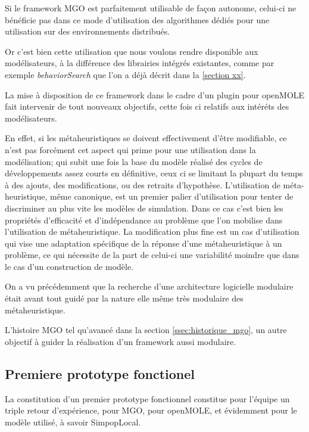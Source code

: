 Si le framework MGO est parfaitement utilisable de façon autonome, celui-ci ne bénéficie pas dans ce mode d'utilisation des algorithmes dédiés pour une utilisation sur des environnements distribués.

Or c'est bien cette utilisation que nous voulons rendre disponible aux modélisateurs, à la différence des librairies intégrés existantes, comme par exemple \textit{behaviorSearch} que l'on a déjà décrit dans la \ref{section xx}.


La mise à disposition de ce framework dans le cadre d'un plugin pour openMOLE fait intervenir de tout nouveaux objectifs, cette fois ci relatifs aux intéréts des modélisateurs.

En effet, si les métaheuristiques se doivent effectivement d'être modifiable, ce n'est pas forcément cet aspect qui prime pour une utilisation dans la modélisation; qui subit une fois la base du modèle réalisé des cycles de développements assez courts en définitive, ceux ci se limitant la plupart du temps à des ajouts, des modifications, ou des retraits d'hypothèse. L'utilisation de méta-heuristique, même canonique, est un premier palier d'utilisation pour tenter de discriminer au plus vite les modèles de simulation. Dans ce cas c'est bien les propriétés d'efficacité et d'indépendance au problème que l'on mobilise dans l'utilisation de métaheuristique. La modification plus fine est un cas d'utilisation qui vise une adaptation spécifique de la réponse d'une métaheuristique à un problème, ce qui nécessite de la part de celui-ci une variabilité moindre que dans le cas d'un construction de modèle.


On a vu précédemment que la recherche d'une architecture logicielle modulaire était avant tout guidé par la nature elle même très modulaire des métaheuristique.



L'histoire MGO tel qu'avancé dans la section \ref{ssec:historique_mgo}, un autre objectif à guider la réalisation d'un framework aussi modulaire.


\subsection{Premiere prototype fonctionel}
\label{p:prototype_fonctionel}

La constitution d'un premier prototype fonctionnel constitue pour l'équipe un triple retour d'expérience, pour MGO, pour openMOLE, et évidemment pour le modèle utilisé, à savoir SimpopLocal.

